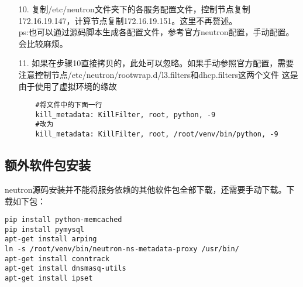 \documentclass[a4paper,left=1.5cm,right=1.5cm,11pt]{article}
\begin{document}
\begin{itemize}
\begin{lstlisting}
	[libvirt]  #保持原有配置
	...
	\end{lstlisting}
	上面配置可能会有遗漏，建议参考172.16.19.147
	\item[10.]复制/etc/neutron文件夹下的各服务配置文件，控制节点复制172.16.19.147，计算节点复制172.16.19.151。这里不再赘述。\\
	ps:也可以通过源码脚本生成各配置文件，参考官方neutron配置，手动配置。会比较麻烦。
	\item[11.]如果在步骤10直接拷贝的，此处可以忽略。如果手动参照官方配置，需要注意控制节点/etc/neutron/rootwrap.d/l3.filters和dhcp.filters这两个文件
	这是由于使用了虚拟环境的缘故
	\begin{lstlisting}
	#将文件中的下面一行
	kill_metadata: KillFilter, root, python, -9
	#改为
	kill_metadata: KillFilter, root, /root/venv/bin/python, -9
	\end{lstlisting}
\end{itemize}
\subsection{额外软件包安装}
neutron源码安装并不能将服务依赖的其他软件包全部下载，还需要手动下载。下载如下包：
\begin{lstlisting}
pip install python-memcached
pip install pymysql
apt-get install arping 
ln -s /root/venv/bin/neutron-ns-metadata-proxy /usr/bin/
apt-get install conntrack
apt-get install dnsmasq-utils
apt-get install ipset
\end{lstlisting}
\end{document}
